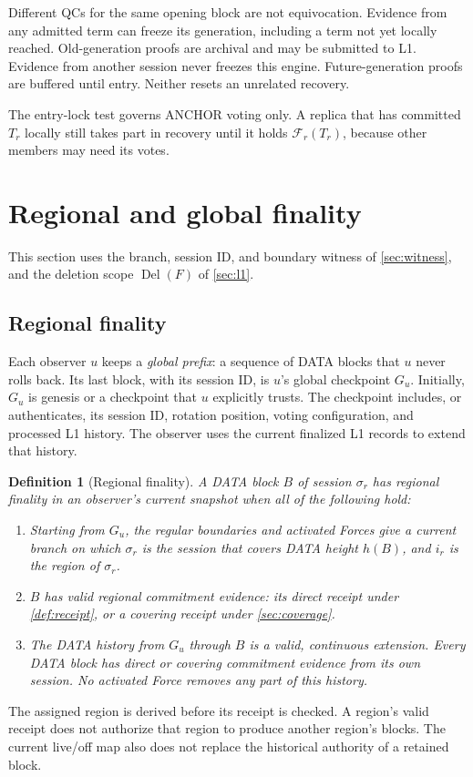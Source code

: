 \documentclass[11pt,a4paper]{article}
\newcommand{\RR}[1]{{\color{rrRed}#1}}
\newif\ifrevmarks
\newcommand{\Rv}[1]{\ifrevmarks\leavevmode{\color{rvBlue}#1}\else#1\fi}
\newcommand{\Cid}[1]{\ifrevmarks\textsuperscript{\hyperlink{chg:#1}{\color{rvBlue}\sffamily\scriptsize#1}}\fi}
\newcommand{\FC}{\mathcal F}
\newcommand{\Del}{\operatorname{Del}}
\newtheorem{definition}{Definition}[section]
\begin{document}
Different QCs for the same opening block are not equivocation. Evidence
from any admitted term can freeze its generation, including a term not
yet locally reached. Old-generation proofs are archival and may be
submitted to L1. \RR{Evidence from another session never freezes this
engine.} Future-generation proofs are buffered until entry. Neither
resets an unrelated recovery.

The entry-lock test governs ANCHOR voting only. A replica that has
committed $T_r$ locally still takes part in recovery until it holds
$\FC_r(T_r)$, because other members may need its votes.

\section{Regional and global finality}
\label{sec:external}
\Rv{This section uses the branch, session ID, and boundary
witness of \cref{sec:witness}, and the deletion scope $\Del(F)$ of
\cref{sec:l1}.}

\subsection{Regional finality}
\label{sec:regional-finality}
\Rv{Each observer $u$ keeps a \emph{global prefix}: a sequence
of DATA blocks that $u$ never rolls back. Its last block, with its
session ID, is $u$'s global checkpoint $G_u$. Initially, $G_u$ is
genesis or a checkpoint that $u$ explicitly trusts.}
The checkpoint includes, or authenticates, its \Rv{session ID}, rotation
position, voting configuration, and processed L1 history. The observer
uses the current finalized L1 records to extend that history.

\begin{definition}[Regional finality]
\label{def:regional-finality}
A DATA block $B$ \Rv{of session $\sigma_r$} has regional finality in an observer's current snapshot
when all of the following hold:
\begin{enumerate}[label=(\roman*)]
\item \Rv{Starting from $G_u$, the regular boundaries and
activated Forces give a current branch on which $\sigma_r$ is the
session that covers DATA height $h(B)$, and $i_r$ is the region of
$\sigma_r$.}
\item $B$ has valid regional commitment evidence: its direct receipt
under \cref{def:receipt}, or a covering receipt under \cref{sec:coverage}.
\item The DATA history from $G_u$ through $B$ is a valid, continuous
extension. Every DATA block has direct or covering commitment evidence
from its own \Rv{session}. No
activated Force removes any part of this history.
\end{enumerate}
\end{definition}
The assigned region is derived before its receipt is checked. A region's
valid receipt does not authorize that region to produce another region's
blocks. The current live/off map also does not replace the historical
authority of a retained block.
\end{document}
